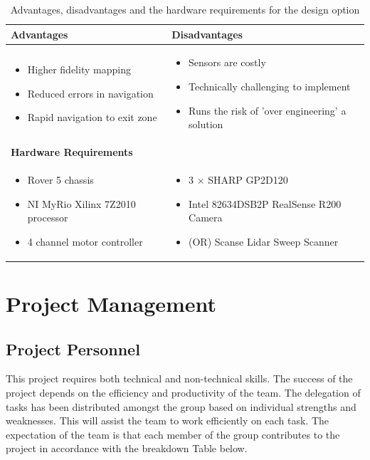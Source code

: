 \documentclass[a4paper]{article}
\begin{document}
\begin{table}[h]
\centering
\caption{Advantages, disadvantages and the hardware requirements for the design option}
\small\begin{tabular}{p{8cm}p{8cm}}
\toprule
\textbf{Advantages} & \textbf{Disadvantages}\\
\midrule
\begin{itemize}\item Higher fidelity mapping \item Reduced errors in navigation \item Rapid navigation to exit zone\end{itemize} &
\begin{itemize}\item Sensors are costly \item Technically challenging to implement \item Runs the risk of 'over engineering' a solution\end{itemize}\\
\midrule
\textbf{Hardware Requirements} & \\
\midrule
\begin{itemize}\item Rover 5 chassis \item NI MyRio Xilinx 7Z2010 processor \item 4 channel motor controller \end{itemize} & \begin{itemize} \item 3 $\times$ SHARP GP2D120 \item Intel 82634DSB2P RealSense R200 Camera \item (OR) Scanse Lidar Sweep Scanner \end{itemize}\\
\bottomrule
\end{tabular}
\end{table}
\section{Project Management}
\subsection{Project Personnel}
This project requires both technical and non-technical skills. The success of the project depends on the efficiency and productivity of the team. The delegation of tasks has been distributed amongst the group based on individual strengths and weaknesses. This will assist the team to work efficiently on each task. The expectation of the team is that each member of the group contributes to the project in accordance with the breakdown Table below.
\end{document}
